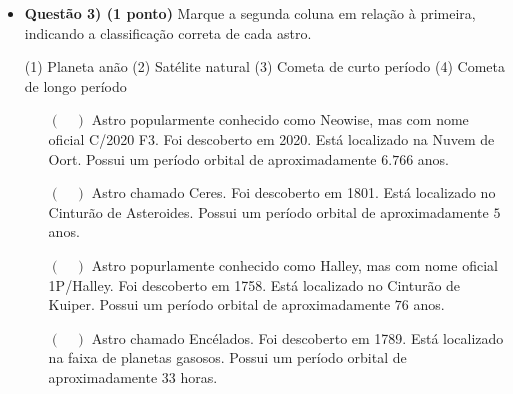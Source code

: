 \documentclass[a4paper, 12pt]{article}
\begin{document}
\begin{itemize}
		\item \textbf{Questão 3) (1 ponto)} Marque a segunda coluna em relação à primeira, indicando a classificação correta de cada astro.
			\begin{multicols}{2}
				\vfill\null \vfill\null
				\begin{flushleft}
					(1) Planeta anão \linebreak
					(2) Satélite natural \linebreak
					(3) Cometa de curto período \linebreak
					(4) Cometa de longo período
				\end{flushleft}
				\vfill\null \vfill\null
				\columnbreak
				\begin{itemize}
					\item[$(\quad)$] Astro popularmente conhecido como Neowise, mas com nome oficial C/2020 F3. Foi descoberto em 2020. Está localizado na Nuvem de Oort. Possui um período orbital de aproximadamente $6.766$ anos.
					\item[$(\quad)$] Astro chamado Ceres. Foi descoberto em 1801. Está localizado no Cinturão de Asteroides. Possui um período orbital de aproximadamente $5$ anos.
					\item[$(\quad)$] Astro popurlamente conhecido como Halley, mas com nome oficial 1P/Halley. Foi descoberto em 1758. Está localizado no Cinturão de Kuiper. Possui um período orbital de aproximadamente $76$ anos.
					\item[$(\quad)$] Astro chamado Encélados. Foi descoberto em 1789. Está localizado na faixa de planetas gasosos. Possui um período orbital de aproximadamente 33 horas.
				\end{itemize}


\end{multicols}
\end{itemize}
\end{document}
